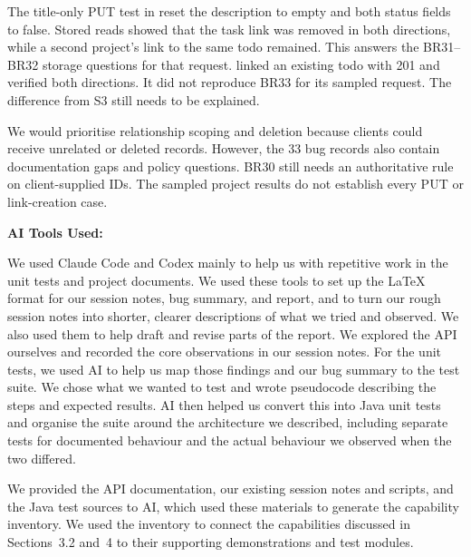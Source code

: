 \documentclass[12pt,letterpaper]{article}
\begin{document}
The title-only PUT test in 
reset the description to empty and both status fields to false. Stored reads
showed that the task link was removed in both directions, while a second project's
link to the same todo remained. This answers the BR31--BR32 storage questions
for that request.
 linked an existing todo
with 201 and verified both directions. It did not reproduce BR33 for its sampled
request. The difference from S3 still needs to be explained.

We would prioritise relationship scoping and deletion because clients could
receive unrelated or deleted records. However, the 33 bug records also contain
documentation gaps and policy questions. BR30 still needs an authoritative rule
on client-supplied IDs. The sampled project results do not establish every PUT
or link-creation case.

\NewContentPage
\begingroup
\setlength{\parskip}{0pt}
\newcommand{\DisclosureHeading}[1]{%
  \par\addvspace{12bp}%
  \noindent\textbf{#1:}\par\nobreak\vspace{4bp}}
\vspace{10bp}

\DisclosureHeading{AI Tools Used}
We used Claude Code and Codex mainly to help us with repetitive work in the unit
tests and project documents. We used these tools to set up the LaTeX format for our session notes,
bug summary, and report, and to turn our rough session notes into shorter, clearer
descriptions of what we tried and observed. We also used them to help draft and
revise parts of the report. We explored the API ourselves and recorded the core
observations in our session notes. For the unit tests, we used AI to help us map
those findings and our bug summary to the test suite. We chose what we
wanted to test and wrote pseudocode describing the steps and expected results.
AI then helped us convert this into Java unit tests and organise the suite around
the architecture we described, including separate tests for documented behaviour
and the actual behaviour we observed when the two differed.

We provided the API documentation, our existing session notes and scripts, and
the Java test sources to AI, which used these materials to generate the
capability inventory. We used the inventory to connect the
capabilities discussed in Sections~3.2 and~4 to their supporting demonstrations
and test modules.
\end{document}
